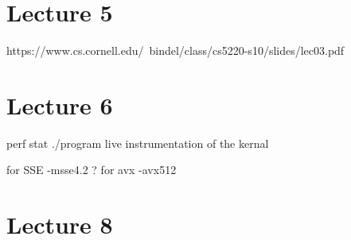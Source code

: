 \documentclass[a4paper,10pt,titlepage]{report}
\begin{document}
\section{Lecture 5}
https://www.cs.cornell.edu/~bindel/class/cs5220-s10/slides/lec03.pdf





\section{Lecture 6}


perf stat ./program
live instrumentation of the kernal
 
 
for SSE -msse4.2 ?
for avx -avx512




\section{Lecture 8}

	













































	
\end{document}
